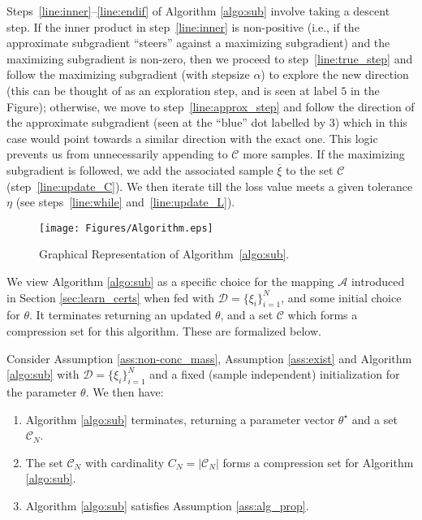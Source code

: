 Steps~\ref{line:inner}--\ref{line:endif} of Algorithm \ref{algo:sub} involve taking a descent step.  
If the inner product in step~\ref{line:inner} is non-positive (i.e., if the approximate subgradient ``steers'' against a maximizing subgradient) and the maximizing subgradient is non-zero, then we proceed to step~\ref{line:true_step} and follow the maximizing subgradient (with stepsize $\alpha$) to explore the new direction (this can be thought of as an exploration step, and is seen at label $5$ in the Figure); otherwise, we move to step~\ref{line:approx_step} and follow the direction of the approximate subgradient (seen at the ``blue'' dot labelled by $3$) which in this case would point towards a similar direction with the exact one. This logic prevents us from unnecessarily appending to $\mathcal{C}$ more samples.
If the maximizing subgradient is followed, we add the associated sample $\overline{\xi}$ to the set $\mathcal{C}$ (step~\ref{line:update_C}). 
We then iterate till the loss value meets a given tolerance $\eta$ (see steps~\ref{line:while} and~\ref{line:update_L}).

\begin{figure}[b]
    \centering
    \texttt{[image: Figures/Algorithm.eps]}
    \caption{Graphical Representation of Algorithm~\ref{algo:sub}.}
    \label{fig:algorithm}
\end{figure}

We view Algorithm \ref{algo:sub} as a specific choice for the mapping $\mathcal{A}$ introduced in Section \ref{sec:learn_certs} when fed with $\mathcal{D} = \{\xi_i\}_{i=1}^N$, and some initial choice for $\theta$. 
It terminates returning an updated $\theta$, and a set $\mathcal{C}$ which forms a compression set for this algorithm. 
These are formalized below.

\begin{prop} \label{prop:converge}
Consider Assumption \ref{ass:non-conc_mass}, Assumption  \ref{ass:exist} and Algorithm \ref{algo:sub} with $\mathcal{D} = \{\xi_i\}_{i=1}^N$ and a fixed (sample independent) initialization for the parameter $\theta$. We then have:
\begin{enumerate}[wide, labelwidth=!, labelindent=0pt]
\item Algorithm \ref{algo:sub} terminates, returning a parameter vector $\theta^\star$ and a set $\mathcal{C}_N$.
\item The set $\mathcal{C}_N$ with cardinality $C_N = |\mathcal{C}_N|$ forms a compression set for Algorithm \ref{algo:sub}.
\item Algorithm \ref{algo:sub} satisfies Assumption \ref{ass:alg_prop}.
\end{enumerate}
\end{prop}

